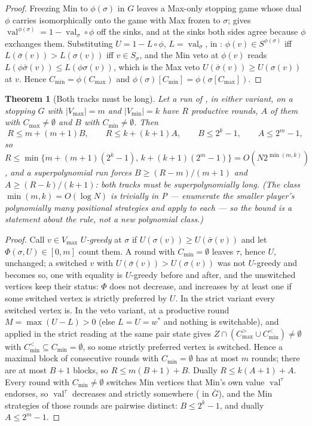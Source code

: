 \documentclass[11pt]{article}
\theoremstyle{plain}
\newtheorem{theorem}{Theorem}[section]
\theoremstyle{definition}
\DeclareMathOperator{\val}{val}
\newcommand{\Vmax}{V_{\max}}
\newcommand{\Vmin}{V_{\min}}
\begin{document}
\begin{proof}
Freezing Min to $\phi(\sigma)$ in $G$ leaves a Max-only stopping game
whose dual $\phi$ carries isomorphically onto the game with Max frozen to
$\sigma$;  gives $\val^{\phi(\sigma)}=1-\val_\sigma\circ\phi$
off the sinks, and at the sinks both sides agree because $\phi$ exchanges
them. Substituting $U=1-L\circ\phi$, $L=\val_\sigma$, in :
$\phi(v)\in S^{\phi(\sigma)}$ iff $L(\bar\sigma(v))>L(\sigma(v))$ iff
$v\in S_\sigma$, and the Min veto at $\phi(v)$ reads
$L(\phi\bar\sigma(v))\le L(\phi\sigma(v))$, which is the Max veto
$U(\bar\sigma(v))\ge U(\sigma(v))$ at $v$. Hence $C_{\min}=\phi(C_{\max})$
and $\phi(\sigma)[C_{\min}]=\phi(\sigma[C_{\max}])$.
\end{proof}

\begin{theorem}[Both tracks must be long]\label{thm:bsi-tracks}
Let a run of , in either variant, on a stopping $G$ with
$|\Vmax|=m$ and $|\Vmin|=k$ have $R$ productive rounds, $A$ of them with
$C_{\max}\ne\emptyset$ and $B$ with $C_{\min}\ne\emptyset$. Then
\[
  R\le m+(m+1)B,\qquad R\le k+(k+1)A,\qquad B\le2^{k}-1,\qquad A\le2^{m}-1,
\]
so $R\le\min\{m+(m+1)(2^{k}-1),\,k+(k+1)(2^{m}-1)\}=O(N2^{\min(m,k)})$, and
a superpolynomial run forces $B\ge(R-m)/(m+1)$ and $A\ge(R-k)/(k+1)$:
both tracks must be superpolynomially long. (The class
$\min(m,k)=O(\log N)$ is trivially in P --- enumerate the smaller player's
polynomially many positional strategies and apply 
to each --- so the bound is a statement about the rule, not a new
polynomial class.)
\end{theorem}

\begin{proof}
Call $v\in\Vmax$ \emph{$U$-greedy} at $\sigma$ if $U(\sigma(v))\ge U(\bar\sigma(v))$
and let $\Phi(\sigma,U)\in[0,m]$ count them. A round with
$C_{\min}=\emptyset$ leaves $\tau$, hence $U$, unchanged; a switched $v$
with $U(\bar\sigma(v))>U(\sigma(v))$ was not $U$-greedy and becomes so,
one with equality is $U$-greedy before and after, and the unswitched
vertices keep their status: $\Phi$ does not decrease, and increases by at
least one if some switched vertex is strictly preferred by $U$. In the
strict variant every switched vertex is. In the veto variant, at a
productive round $M=\max(U-L)>0$ (else $L=U=w^{\ast}$ and nothing is
switchable), and  applied in the strict reading at
the same pair state gives $Z\cap(C^{>}_{\max}\cup C^{<}_{\min})\ne\emptyset$
with $C^{<}_{\min}\subseteq C_{\min}=\emptyset$, so some strictly preferred
vertex is switched. Hence a maximal block of consecutive rounds with
$C_{\min}=\emptyset$ has at most $m$ rounds; there are at most $B+1$
blocks, so $R\le m(B+1)+B$. Dually $R\le k(A+1)+A$. Every round with
$C_{\min}\ne\emptyset$ switches Min vertices that Min's own value
$\val^{\tau}$ endorses, so $\val^{\tau}$ decreases and strictly somewhere
( in $\bar G$), and the Min strategies of those rounds
are pairwise distinct: $B\le2^{k}-1$, and dually $A\le2^{m}-1$.
\end{proof}
\end{document}
